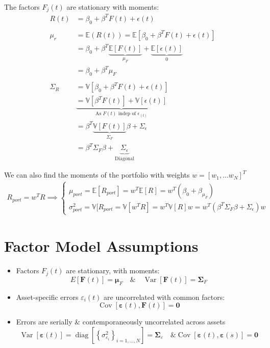 \documentclass[
  oneside]{book}
\providecommand{\tightlist}{%
  \setlength{\itemsep}{0pt}\setlength{\parskip}{0pt}}
\begin{document}
The factors \(F_{j}(t)\) are stationary with moments:
\[
\begin{aligned}
R(t) &= \beta_{0} + \beta^{T}F(t) + \epsilon(t)\\
\\
\mu_{r} &= \mathbb{E}(R(t)) = \mathbb{E}[\beta_{0} + \beta^{T}F(t) + \epsilon(t)]\\
&= \beta_{0}+\beta^{T}\underbrace{ \mathbb{E}[F(t)] }_{ \mu_{F} } + \underbrace{ \mathbb{E}[\epsilon(t)] }_{ 0 }\\
&= \beta_{0} + \beta^{T}\mu_{F}\\
\\
\Sigma_{R} &= \mathbb{V}[\beta_{0}+\beta^{T}F(t) +\epsilon(t)]\\
&\underbrace{= \mathbb{V}[\beta^{T}F(t)] + \mathbb{V}[\epsilon(t)]}_{ \text{As } F(t)\text{ indep of } \epsilon_(t)}\\
&= \beta^{T}\underbrace{ \mathbb{V}[F(t)] }_{ \Sigma_{F} }\beta+\Sigma_{\epsilon}\\
&= \beta^{T}\Sigma_{F}\beta+\underbrace{ \Sigma_{\epsilon} }_{ \text{Diagonal} }
\end{aligned}
\]

We can also find the moments of the portfolio with weights \(w = [w_{1}, \dots w_{N}]^{T}\)
\[
\begin{aligned}
R_{port} = w^{T}R \implies \begin{cases}
\mu_{port} = \mathbb{E}[R_{port}] = w^{T}\mathbb{E}[R] = w^{T}(\beta_{0}+\beta_{\mu_{F}}) \\
\sigma^{2}_{port} = \mathbb{V}[R_{port} = \mathbb{V}[w^{T}R] = w^{T}\mathbb{V}[R]w = w^{T}(\beta^{T}\Sigma_{F}\beta+\Sigma_{\epsilon})w
\end{cases}
\end{aligned}
\]

\hypertarget{factor-model-assumptions}{%
\section{Factor Model Assumptions}\label{factor-model-assumptions}}

\begin{itemize}
\tightlist
\item
  Factors \(F_j(t)\) are stationary, with moments:
  \[
  E[\mathbf{F}(t)]=\boldsymbol{\mu}_F \quad \& \quad \operatorname{Var}[\mathbf{F}(t)]=\boldsymbol{\Sigma}_F
  \]
\item
  Asset-specific errors \(\varepsilon_i(t)\) are uncorrelated with common factors:
  \[
  \operatorname{Cov}[\mathbf{\varepsilon}(t), \mathbf{F}(t)]=\mathbf{0}
  \]
\item
  Errors are serially \& contemporaneously uncorrelated across assets
  \[
  \operatorname{Var}[\boldsymbol{\varepsilon}(t)]=\operatorname{diag}\left[\left\{\sigma_{\varepsilon_i}^2\right\}_{i=1, \ldots, N}\right]=\boldsymbol{\Sigma}_{\varepsilon} \quad \& \operatorname{Cov}[\boldsymbol{\varepsilon}(t), \boldsymbol{\varepsilon}(s)]=\mathbf{0}
  \]
\end{itemize}
\end{document}
